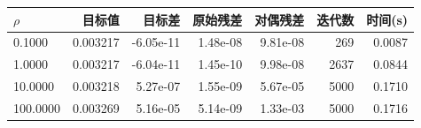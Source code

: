 \begin{center}
\small
\begin{tabular}{lrrrrrr}
\toprule
$\rho$ & 目标值 & 目标差 & 原始残差 & 对偶残差 & 迭代数 & 时间(s) \\
\midrule
0.1000 & 0.003217 & -6.05e-11 & 1.48e-08 & 9.81e-08 & 269 & 0.0087 \\
1.0000 & 0.003217 & -6.04e-11 & 1.45e-10 & 9.98e-08 & 2637 & 0.0844 \\
10.0000 & 0.003218 & 5.27e-07 & 1.55e-09 & 5.67e-05 & 5000 & 0.1710 \\
100.0000 & 0.003269 & 5.16e-05 & 5.14e-09 & 1.33e-03 & 5000 & 0.1716 \\
\bottomrule
\end{tabular}
\end{center}
